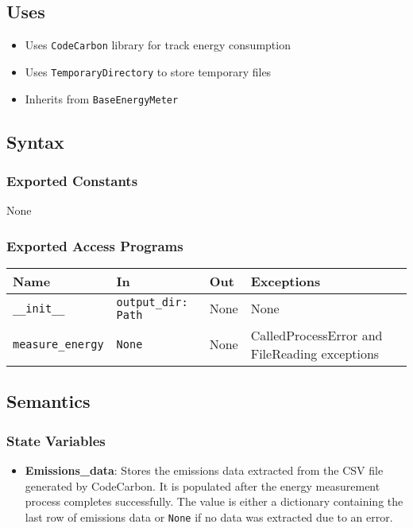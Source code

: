 \documentclass[12pt, titlepage]{article}
\begin{document}
\subsection{Uses}

\begin{itemize}
    \item Uses \texttt{CodeCarbon} library for track energy consumption
    \item Uses \texttt{TemporaryDirectory} to store temporary files
    \item Inherits from \texttt{BaseEnergyMeter}
\end{itemize}

\subsection{Syntax}

\subsubsection{Exported Constants}
None

\subsubsection{Exported Access Programs}

\begin{center}
\begin{tabular}{|p{3cm}|p{5cm}|p{2cm}|p{3cm}|}
\hline
\textbf{Name} & \textbf{In} & \textbf{Out} & \textbf{Exceptions} \\
\hline
\texttt{\_\_init\_\_} & \texttt{output\_dir: Path} & None & None \\
\hline
\texttt{measure\_energy} & \texttt{None} & None & CalledProcessError and FileReading exceptions \\
\hline
\end{tabular}
\end{center}

\subsection{Semantics}

\subsubsection{State Variables}

\begin{itemize}
    \item \textbf{Emissions\_data}: Stores the emissions data extracted from the CSV file generated by CodeCarbon. It is populated after the energy measurement process completes successfully. The value is either a dictionary containing the last row of emissions data or \texttt{None} if no data was extracted due to an error.

\end{itemize}
\end{document}
